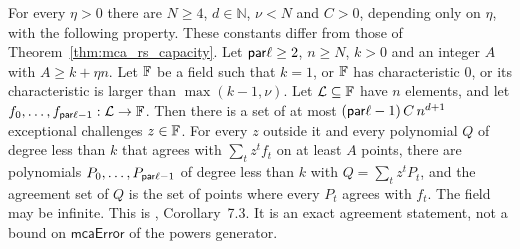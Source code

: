 \begin{theorem}\label{thm:power_batching_capacity}
\leanok
{}
    For every $\eta>0$ there are $N\ge4$, $d\in\mathbb{N}$, $\nu<N$ and $C>0$, depending only on
    $\eta$, with the following property. These constants differ from those of
    Theorem~\ref{thm:mca_rs_capacity}. Let $\mathsf{par}\ell\ge2$, $n\ge N$, $k>0$ and an integer $A$ with
    $A\ge k+\eta n$. Let $\mathbb{F}$ be a field such that $k=1$, or $\mathbb{F}$ has characteristic $0$,
    or its characteristic is larger than $\max(k-1,\nu)$. Let $\mathcal{L}\subseteq\mathbb{F}$ have
    $n$ elements, and let $f_0,\ldots,f_{\mathsf{par}\ell-1}:\mathcal{L}\to\mathbb{F}$. Then there is a set of at
    most $(\mathsf{par}\ell-1)\,C\,n^{d+1}$ exceptional challenges $z\in\mathbb{F}$. For every $z$ outside it and
    every polynomial $Q$ of degree less than $k$ that agrees with $\sum_{t}z^t f_t$ on at least $A$
    points, there are polynomials $P_0,\ldots,P_{\mathsf{par}\ell-1}$ of degree less than $k$ with
    $Q=\sum_t z^t P_t$, and the agreement set of $Q$ is the set of points where every $P_t$ agrees
    with $f_t$. The field may be infinite. This is \cite{DKT26}, Corollary~7.3. It is an exact
    agreement statement, not a bound on $\mathsf{mcaError}$ of the powers generator.
\end{theorem}

